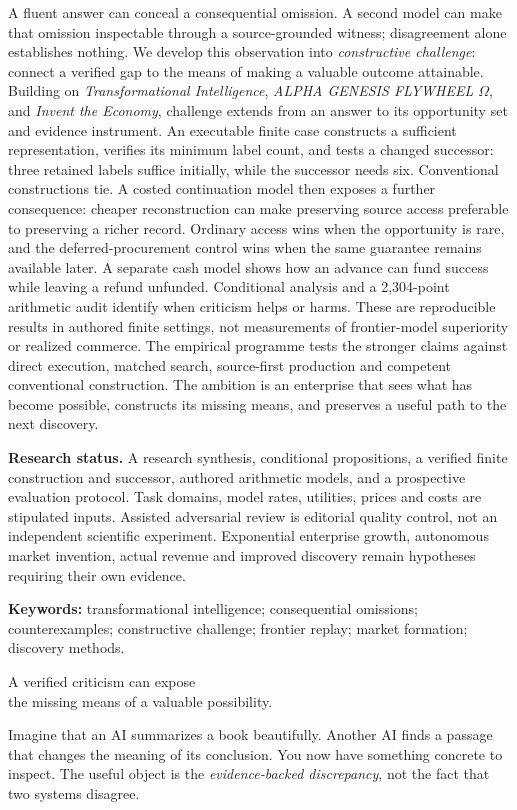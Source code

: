 \documentclass[11pt,letterpaper]{article}
\theoremstyle{remark}\newtheorem{remark}{Remark}[section]
\newcommand{\smallhead}[1]{\par\smallskip{\sffamily\bfseries\color{Gold}#1}\par\smallskip}
\begin{document}
A fluent answer can conceal a consequential omission. A second model can make that omission inspectable through a source-grounded witness; disagreement alone establishes nothing. We develop this observation into \emph{constructive challenge}: connect a verified gap to the means of making a valuable outcome attainable. Building on \emph{Transformational Intelligence}, \emph{ALPHA GENESIS FLYWHEEL $\Omega$}, and \emph{Invent the Economy}, challenge extends from an answer to its opportunity set and evidence instrument. An executable finite case constructs a sufficient representation, verifies its minimum label count, and tests a changed successor: three retained labels suffice initially, while the successor needs six. Conventional constructions tie. A costed continuation model then exposes a further consequence: cheaper reconstruction can make preserving source access preferable to preserving a richer record. Ordinary access wins when the opportunity is rare, and the deferred-procurement control wins when the same guarantee remains available later. A separate cash model shows how an advance can fund success while leaving a refund unfunded. Conditional analysis and a 2,304-point arithmetic audit identify when criticism helps or harms. These are reproducible results in authored finite settings, not measurements of frontier-model superiority or realized commerce. The empirical programme tests the stronger claims against direct execution, matched search, source-first production and competent conventional construction. The ambition is an enterprise that sees what has become possible, constructs its missing means, and preserves a useful path to the next discovery.
\begin{statusbox}
\textbf{Research status.} A research synthesis, conditional propositions, a verified finite construction and successor, authored arithmetic models, and a prospective evaluation protocol. Task domains, model rates, utilities, prices and costs are stipulated inputs. Assisted adversarial review is editorial quality control, not an independent scientific experiment. Exponential enterprise growth, autonomous market invention, actual revenue and improved discovery remain hypotheses requiring their own evidence.
\end{statusbox}
{\small\textbf{Keywords:} transformational intelligence; consequential omissions; counterexamples; constructive challenge; frontier replay; market formation; discovery methods.}
\clearpage
\smallhead{THE PAPER AT A GLANCE}
\begin{thesisbox}
\Large\bfseries\raggedright A verified criticism can expose\\the missing means of a valuable possibility.
\end{thesisbox}
Imagine that an AI summarizes a book beautifully. Another AI finds a passage that changes the meaning of its conclusion. You now have something concrete to inspect. The useful object is the \emph{evidence-backed discrepancy}, not the fact that two systems disagree.
\end{document}
